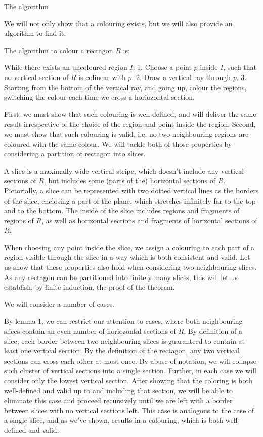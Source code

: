 The algorithm

We will not only show that a colouring exists, but we will also provide an algorithm to find it.

The algorithm to colour a rectagon $R$ is:

While there exists an uncoloured region $I$:
  1. Choose a point $p$ inside $I$, such that no vertical section of $R$ is colinear with $p$.
  2. Draw a vertical ray through $p$.
  3. Starting from the bottom of the vertical ray, and going up, colour the regions, switching the colour each time we cross a horiozontal section.

First, we must show that such colouring is well-defined, and will deliver the same result irrespective of the choice of the region and point inside the region. Second, we must show that such colouring is valid, i.e. no two neighbouring regions are coloured with the same colour. We will tackle both of those properties by considering a partition of rectagon into slices.

A slice is a maximally wide vertical stripe, which doesn't include any vertical sections of $R$, but includes some (parts of the) horizontal sections of $R$. Pictorially, a slice can be represented with two dotted vertical lines as the borders of the slice, enclosing a part of the plane, which stretches infinitely far to the top and to the bottom. The inside of the slice includes regions and fragments of regions of $R$, as well as horizontal sections and fragments of horizontal sections of $R$.

When choosing any point inside the slice, we assign a colouring to each part of a region visible through the slice in a way which is both consistent and valid. Let us show that these properties also hold when considering two neighbouring slices. As any rectagon can be partitioned into finitely many slices, this will let us establish, by finite induction, the proof of the theorem.

We will consider a number of cases.

By lemma 1, we can restrict our attention to cases, where both neighbouring slices contain an even number of horiozontal sections of $R$. By definition of a slice, each border between two neighbouring slices is guaranteed to contain at least one vertical section. By the definition of the rectagon, any two vertical sections can cross each other at most once. By abuse of notation, we will collapse such cluster of vertical sections into a single section. Further, in each case we will consider only the lowest vertical section. After showing that the coloring is both well-defined and valid up to and including that section, we will be able to eliminate this case and proceed recursively until we are left with a border between slices with no vertical sections left. This case is analogous to the case of a single slice, and as we've shown, results in a colouring, which is both well-defined and valid.


